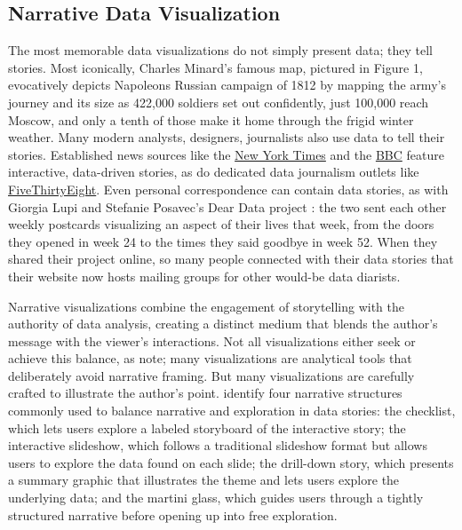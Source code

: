 \subsection{Narrative Data Visualization}
The most memorable data visualizations do not simply present data; they tell stories. Most iconically, Charles Minard's famous map, pictured in Figure 1, evocatively depicts Napoleons Russian campaign of 1812 by mapping the army's journey and its size as 422,000 soldiers set out confidently, just 100,000 reach Moscow, and only a tenth of those make it home through the frigid winter weather. Many modern analysts, designers, journalists also use data to tell their stories. Established news sources like the \href{http://www.nytimes.com/interactive/2015/us/year-in-interactive-storytelling.html}{New York Times} and the \href{http://www.bbc.com/news/11628973}{BBC} feature interactive, data-driven stories, as do dedicated data journalism outlets like \href{http://fivethirtyeight.com/}{FiveThirtyEight}. Even personal correspondence can contain data stories, as with Giorgia Lupi and Stefanie Posavec's Dear Data project \citep{DearData}: the two sent each other weekly postcards visualizing an aspect of their lives that week, from the doors they opened in week 24 to the times they said goodbye in week 52. When they shared their project online, so many people connected with their data stories that their website now hosts mailing groups for other would-be data diarists.

Narrative visualizations combine the engagement of storytelling with the authority of data analysis, creating a distinct medium that blends the author's message with the viewer's interactions. Not all visualizations either seek or achieve this balance, as \citet{LeeEtAl2015More} note; many visualizations are analytical tools that deliberately avoid narrative framing. But many visualizations are carefully crafted to illustrate the author's point. \citet{SegelHeer2010Narrative} identify four narrative structures commonly used to balance narrative and exploration in data stories: the checklist, which lets users explore a labeled storyboard of the interactive story; the interactive slideshow, which follows a traditional slideshow format but allows users to explore the data found on each slide; the drill-down story, which presents a summary graphic that illustrates the theme and lets users explore the underlying data; and the martini glass, which guides users through a tightly structured narrative before opening up into free exploration.

